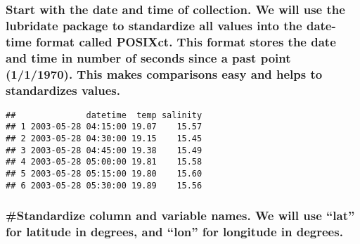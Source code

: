 \documentclass[
]{article}
\newenvironment{Shaded}{\begin{snugshade}}{\end{snugshade}}
\newcommand{\AttributeTok}[1]{\textcolor[rgb]{0.13,0.29,0.53}{#1}}
\newcommand{\CommentTok}[1]{\textcolor[rgb]{0.56,0.35,0.01}{\textit{#1}}}
\newcommand{\FunctionTok}[1]{\textcolor[rgb]{0.13,0.29,0.53}{\textbf{#1}}}
\newcommand{\NormalTok}[1]{#1}
\newcommand{\OtherTok}[1]{\textcolor[rgb]{0.56,0.35,0.01}{#1}}
\newcommand{\SpecialCharTok}[1]{\textcolor[rgb]{0.81,0.36,0.00}{\textbf{#1}}}
\newcommand{\StringTok}[1]{\textcolor[rgb]{0.31,0.60,0.02}{#1}}
\begin{document}
\hypertarget{start-with-the-date-and-time-of-collection.-we-will-use-the-lubridate-package-to-standardize-all-values-into-the-date-time-format-called-posixct.-this-format-stores-the-date-and-time-in-number-of-seconds-since-a-past-point-111970.-this-makes-comparisons-easy-and-helps-to-standardizes-values.}{%
\subsubsection{Start with the date and time of collection. We will use
the lubridate package to standardize all values into the date-time
format called POSIXct. This format stores the date and time in number of
seconds since a past point (1/1/1970). This makes comparisons easy and
helps to standardizes
values.}\label{start-with-the-date-and-time-of-collection.-we-will-use-the-lubridate-package-to-standardize-all-values-into-the-date-time-format-called-posixct.-this-format-stores-the-date-and-time-in-number-of-seconds-since-a-past-point-111970.-this-makes-comparisons-easy-and-helps-to-standardizes-values.}}

\begin{Shaded}
\end{Shaded}

\begin{verbatim}
##              datetime  temp salinity
## 1 2003-05-28 04:15:00 19.07    15.57
## 2 2003-05-28 04:30:00 19.15    15.45
## 3 2003-05-28 04:45:00 19.38    15.49
## 4 2003-05-28 05:00:00 19.81    15.58
## 5 2003-05-28 05:15:00 19.80    15.60
## 6 2003-05-28 05:30:00 19.89    15.56
\end{verbatim}

\hypertarget{standardize-column-and-variable-names.-we-will-use-lat-for-latitude-in-degrees-and-lon-for-longitude-in-degrees.}{%
\subsubsection{\#Standardize column and variable names. We will use
``lat'' for latitude in degrees, and ``lon'' for longitude in
degrees.}\label{standardize-column-and-variable-names.-we-will-use-lat-for-latitude-in-degrees-and-lon-for-longitude-in-degrees.}}
\end{document}
